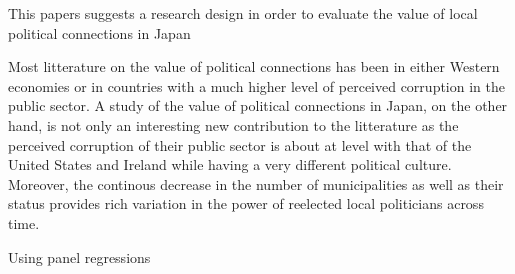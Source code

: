 This papers suggests a research design in order to evaluate the value of local political connections in Japan

Most litterature on the value of political connections has been in either Western economies or in countries with a much higher level of perceived corruption in the public sector. A study of the value of political connections in Japan, on the other hand, is not only an interesting new contribution to the litterature as the perceived corruption of their public sector is about at level with that of the United States and Ireland while having a very different political culture. Moreover, the continous decrease in the number of municipalities as well as their status provides rich variation in the power of reelected local politicians across time.

Using panel regressions
